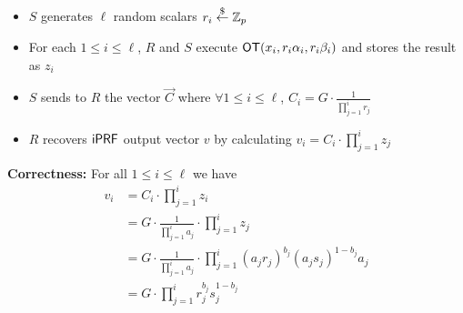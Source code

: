 \begin{itemize}
\item $S$ generates $\ell$ random scalars $r_i\stackrel{\$}{\leftarrow}\mathbb{Z}_p$
\item For each $1 \leq i \leq \ell$, $R$ and $S$ execute $\mathsf{OT}(x_i, r_i\alpha_i, r_i\beta_i)$ and stores the result as $z_i$
\item $S$ sends to $R$ the vector $\vec{C}$ where $\forall 1 \leq i \leq \ell$, $C_i =  G \cdot \frac{1}{\prod_{j=1}^{i} r_j}$
\item $R$ recovers $\mathsf{i}\mathsf{PRF}$ output vector $v$ by calculating $v_i = C_i \cdot \prod_{j=1}^{i} z_j$
\end{itemize}


{\bf Correctness:}  For all $1 \leq i \leq \ell$ we have
\begin{equation}
\begin{aligned}
v_i &= C_i \cdot \prod_{j=1}^{i} z_i \\
&= G \cdot \frac{1}{\prod_{j=1}^{i} a_j} \cdot \prod_{j=1}^{i} z_j \\
&= G \cdot \frac{1}{\prod_{j=1}^{i} a_j} \cdot \prod_{j=1}^{i} (a_jr_j)^{b_j}(a_js_j)^{1-b_j} a_j \\
&= G \cdot \prod_{j=1}^{i} r_j^{b_j}s_j^{1-b_j}
\end{aligned}
\end{equation}



